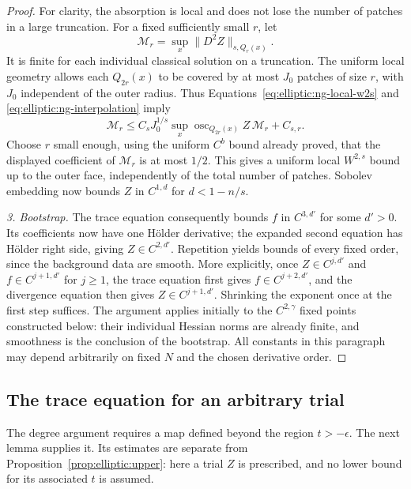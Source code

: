 \begin{proof}
For clarity, the absorption is local and does not lose the number
of patches in a large truncation.  For a fixed sufficiently small
$r$, let
\[
 \mathcal M_r=\sup_x\|D^2Z\|_{s,Q_r(x)}.
\]
It is finite for each individual classical solution on a truncation.
The uniform local geometry allows each $Q_{2r}(x)$ to be covered
by at most $J_0$ patches of size $r$, with $J_0$ independent of the
outer radius.  Thus Equations~\eqref{eq:elliptic:ng-local-w2s} and
\eqref{eq:elliptic:ng-interpolation} imply
\[
 \mathcal M_r
 \le C_s J_0^{1/s}
       \sup_x\operatorname{osc}_{Q_{2r}(x)}Z\,\mathcal M_r
       +C_{s,r}.
\]
Choose $r$ small enough, using the uniform $C^b$ bound already
proved, that the displayed coefficient of $\mathcal M_r$ is at
most $1/2$.  This gives a uniform local $W^{2,s}$ bound up to the
outer face, independently of the total number of patches.  Sobolev
embedding now bounds $Z$ in $C^{1,d}$ for $d<1-n/s$.

\medskip\noindent\emph{3. Bootstrap.}
The trace equation consequently bounds $f$ in $C^{3,d'}$ for some
$d'>0$.  Its coefficients now have one H\"older derivative; the
expanded second equation has H\"older right side, giving
$Z\in C^{2,d'}$.  Repetition yields bounds of every fixed order,
since the background data are smooth.  More explicitly, once
$Z\in C^{j,d'}$ and $f\in C^{j+1,d'}$ for $j\ge1$, the trace
equation first gives $f\in C^{j+2,d'}$, and the divergence equation
then gives $Z\in C^{j+1,d'}$.  Shrinking the exponent once at the
first step suffices.  The argument applies initially to the
$C^{2,\gamma}$ fixed points constructed below: their individual
Hessian norms are already finite, and smoothness is the conclusion
of the bootstrap.  All constants in this paragraph may depend
arbitrarily on fixed $N$ and the chosen derivative order.

\end{proof}

\subsection{The trace equation for an arbitrary trial}

The degree argument requires a map defined beyond the region $t>-\epsilon$.
The next lemma supplies it.  Its estimates are separate from
Proposition~\ref{prop:elliptic:upper}: here a trial $Z$ is prescribed,
and no lower bound for its associated $t$ is assumed.


